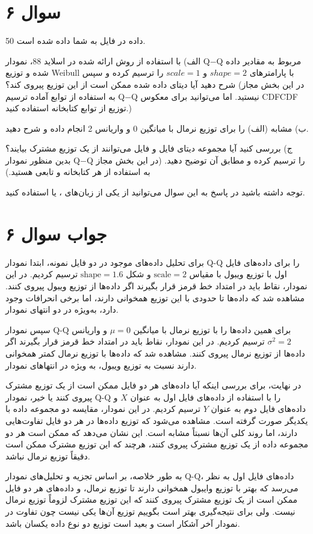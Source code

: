 \section*{سوال ۶}

50 داده در فایل  به شما داده شده است.

الف) با استفاده از روش ارائه شده در اسلاید 88، نمودار Q−Q مربوط به مقادیر داده شده و توزیع Weibull با پارامترهای
$shape=2$
و
$scale=1$
را ترسیم کرده و سپس شرح دهید آیا دیتای داده شده ممکن است از این توزیع پیروی کند؟ (در این بخش مجاز به استفاده از توابع آماده ترسیم Q−Q نیستید. اما می‌توانید برای معکوس 
CDFCDF
توزیع از توابع کتابخانه 
استفاده کنید.)

ب) مشابه (الف) را برای توزیع نرمال با میانگین 0 و واریانس 2 انجام داده و شرح دهید.

ج) بررسی کنید آیا مجموعه دیتای فایل  و فایل  می‌توانند از یک توزیع مشترک بیایند؟ بدین منظور نمودار Q−Q را ترسیم کرده و مطابق آن توضیح دهید. (در این بخش مجاز به استفاده از هر کتابخانه و تابعی هستید.)

توجه داشته باشید در پاسخ به این سوال می‌توانید از یکی از زبان‌های
،
یا
استفاده کنید.

\section*{جواب سوال ۶}

برای تحلیل داده‌های موجود در دو فایل نمونه، ابتدا نمودار Q-Q را برای داده‌های فایل اول با توزیع ویبول با مقیاس \( \text{scale} = 2 \) و شکل \( \text{shape} = 1.6 \) ترسیم کردیم. در این نمودار، نقاط باید در امتداد خط قرمز قرار بگیرند اگر داده‌ها از توزیع ویبول پیروی کنند. مشاهده شد که داده‌ها تا حدودی با این توزیع همخوانی دارند، اما برخی انحرافات وجود دارد، به‌ویژه در دو انتهای نمودار.

سپس نمودار Q-Q برای همین داده‌ها را با توزیع نرمال با میانگین \( \mu = 0 \) و واریانس \( \sigma^2 = 2 \) ترسیم کردیم. در این نمودار، نقاط باید در امتداد خط قرمز قرار بگیرند اگر داده‌ها از توزیع نرمال پیروی کنند. مشاهده شد که داده‌ها با توزیع نرمال کمتر همخوانی دارند نسبت به توزیع ویبول، به ویژه در انتهاهای نمودار.

در نهایت، برای بررسی اینکه آیا داده‌های هر دو فایل ممکن است از یک توزیع مشترک پیروی کنند یا خیر، نمودار Q-Q را با استفاده از داده‌های فایل اول به عنوان \( X \) و داده‌های فایل دوم به عنوان \( Y \) ترسیم کردیم. در این نمودار، مقایسه دو مجموعه داده با یکدیگر صورت گرفته است. مشاهده می‌شود که توزیع داده‌ها در هر دو فایل تفاوت‌هایی دارند، اما روند کلی آن‌ها نسبتاً مشابه است. این نشان می‌دهد که ممکن است هر دو مجموعه داده از یک توزیع مشترک پیروی کنند، هرچند که این توزیع مشترک ممکن است دقیقاً توزیع نرمال نباشد.

به طور خلاصه، بر اساس تجزیه و تحلیل‌های نمودار Q-Q، داده‌های فایل اول به نظر می‌رسد که بهتر با توزیع وایبول همخوانی دارند تا توزیع نرمال، و داده‌های هر دو فایل ممکن است از یک توزیع مشترک پیروی کنند که این توزیع مشترک لزوماً توزیع نرمال نیست. ولی برای نتیجه‌گیری بهتر است بگوییم توزیع آن‌ها یکی نیست چون تفاوت در نمودار آخر آشکار است و بعید است توزیع دو نوع داده یکسان باشد.